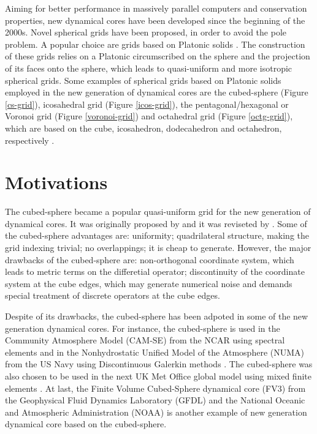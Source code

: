 Aiming for better performance in massively parallel computers and conservation properties, 
new dynamical cores have been developed since the beginning of the 2000s.
Novel spherical grids have been proposed, in order to avoid the pole problem.
A popular choice are grids based on Platonic solids \citep{stan:2012}.
The construction of these grids relies on a Platonic circumscribed on the sphere and 
the projection of its faces onto the sphere, which leads to quasi-uniform and more isotropic
spherical grids.
Some examples of spherical grids based on Platonic solids employed in the new generation
of dynamical cores are the cubed-sphere (Figure \ref{cs-grid}), icosahedral grid (Figure \ref{icos-grid}), 
the pentagonal/hexagonal or Voronoi grid (Figure \ref{voronoi-grid}) and octahedral grid (Figure \ref{octg-grid}),
which are based on the cube, icosahedron, dodecahedron and octahedron, respectively \citep{ullrich:2017}.

\section{Motivations}
The cubed-sphere became a popular quasi-uniform grid for the new generation of dynamical cores.
It was originally proposed by \citet{sadourny:1972} and it was reviseted by \citet{ronchi:1996}.
Some of the cubed-sphere advantages are: uniformity; quadrilateral structure, 
making the grid indexing trivial; no overlappings; it is cheap to generate.
However, the major drawbacks of the cubed-sphere are: non-orthogonal coordinate system, which
leads to metric terms on the differetial operator; discontinuity of the coordinate system
at the cube edges, which may generate numerical noise and
demands special treatment of discrete operators at the cube edges.

Despite of its drawbacks, the cubed-sphere has been adpoted in some of the new generation
dynamical cores.
For instance, the cubed-sphere is used in the 
Community Atmosphere Model (CAM-SE) from the NCAR using spectral elements \citep{dennis:2012} and in the
Nonhydrostatic Unified Model of the Atmosphere (NUMA) from the US Navy using Discontinuous Galerkin 
methods \citep{giraldo:2013}. The cubed-sphere was also chosen to be used in the next UK Met Office
global model using mixed finite elements \citep{melvin:2022}.
At last, the Finite­ Volume Cubed-Sphere dynamical core (FV3) from the Geophysical Fluid 
Dynamics Laboratory (GFDL) and the National Oceanic and Atmospheric Administration (NOAA)
\citep{putman:2007,harris:2013} is another example
of new generation dynamical core based on the cubed-sphere.

